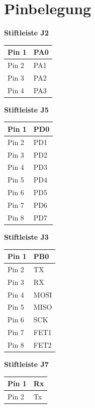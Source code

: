 \documentclass[11pt]{article}
\begin{document}
\section{Pinbelegung}
\begin{minipage}[t]{0.3\textwidth}
	\begin{flushleft}
		\textbf{Stiftleiste J2}
	\end{flushleft}
	\begin{tabular}{l|l}
		Pin 1	&	PA0	\\\hline
		Pin 2	&	PA1	\\\hline
		Pin 3	&	PA2	\\\hline
		Pin 4	&	PA3	
	\end{tabular}
	\begin{flushleft}
		\textbf{Stiftleiste J5}
	\end{flushleft}
	\begin{tabular}{l|l}
		Pin 1	&	PD0	\\\hline
		Pin 2	&	PD1	\\\hline
		Pin 3	&	PD2	\\\hline
		Pin 4	&	PD3	\\\hline
		Pin 5	&	PD4	\\\hline
		Pin 6	&	PD5	\\\hline
		Pin 7	&	PD6	\\\hline
		Pin 8	&	PD7
	\end{tabular}
\end{minipage}
\begin{minipage}[t]{0.3\textwidth}
	\begin{flushleft}
		\textbf{Stiftleiste J3}
	\end{flushleft}
	\begin{tabular}{l|l}
		Pin 1	&	PB0\\\hline
		Pin 2	&	TX\\\hline
		Pin 3	&	RX\\\hline
		Pin 4	&	MOSI\\\hline
		Pin 5	&	MISO\\\hline
		Pin 6	&	SCK\\\hline
		Pin 7	&	FET1\\\hline
		Pin 8	&	FET2	
	\end{tabular}
	\begin{flushleft}
		\textbf{Stiftleiste J7}
	\end{flushleft}
	\begin{tabular}{l|l} 
 		Pin 1 & Rx \\ 
		\hline 
		Pin 2 & Tx \\ 
	\end{tabular} 
\end{minipage}
\end{document}
